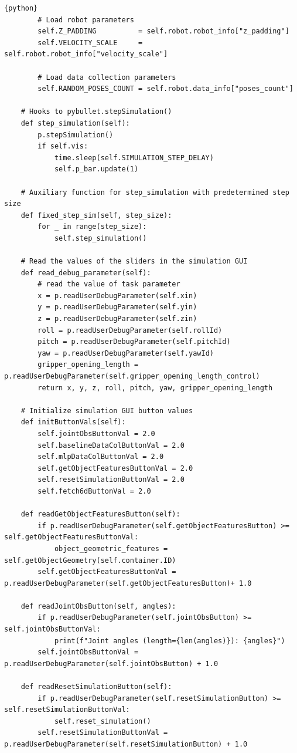 \documentclass[11pt, a4paper]{report}
\begin{document}
\begin{lstlisting}{python}
        # Load robot parameters
        self.Z_PADDING          = self.robot.robot_info["z_padding"]
        self.VELOCITY_SCALE     = self.robot.robot_info["velocity_scale"]

        # Load data collection parameters
        self.RANDOM_POSES_COUNT = self.robot.data_info["poses_count"]

    # Hooks to pybullet.stepSimulation()
    def step_simulation(self):
        p.stepSimulation()
        if self.vis:
            time.sleep(self.SIMULATION_STEP_DELAY)
            self.p_bar.update(1)

    # Auxiliary function for step_simulation with predetermined step size
    def fixed_step_sim(self, step_size):
        for _ in range(step_size):
            self.step_simulation()

    # Read the values of the sliders in the simulation GUI
    def read_debug_parameter(self):   
        # read the value of task parameter        
        x = p.readUserDebugParameter(self.xin)        
        y = p.readUserDebugParameter(self.yin)        
        z = p.readUserDebugParameter(self.zin)       
        roll = p.readUserDebugParameter(self.rollId)        
        pitch = p.readUserDebugParameter(self.pitchId)        
        yaw = p.readUserDebugParameter(self.yawId)        
        gripper_opening_length = p.readUserDebugParameter(self.gripper_opening_length_control)
        return x, y, z, roll, pitch, yaw, gripper_opening_length

    # Initialize simulation GUI button values
    def initButtonVals(self):
        self.jointObsButtonVal = 2.0
        self.baselineDataColButtonVal = 2.0
        self.mlpDataColButtonVal = 2.0
        self.getObjectFeaturesButtonVal = 2.0
        self.resetSimulationButtonVal = 2.0
        self.fetch6dButtonVal = 2.0
    
    def readGetObjectFeaturesButton(self):
        if p.readUserDebugParameter(self.getObjectFeaturesButton) >= self.getObjectFeaturesButtonVal:
            object_geometric_features = self.getObjectGeometry(self.container.ID)
        self.getObjectFeaturesButtonVal = p.readUserDebugParameter(self.getObjectFeaturesButton)+ 1.0

    def readJointObsButton(self, angles):
        if p.readUserDebugParameter(self.jointObsButton) >= self.jointObsButtonVal:
            print(f"Joint angles (length={len(angles)}): {angles}")
        self.jointObsButtonVal = p.readUserDebugParameter(self.jointObsButton) + 1.0
    
    def readResetSimulationButton(self):
        if p.readUserDebugParameter(self.resetSimulationButton) >= self.resetSimulationButtonVal:
            self.reset_simulation()
        self.resetSimulationButtonVal = p.readUserDebugParameter(self.resetSimulationButton) + 1.0
    

\end{lstlisting}
\end{document}

